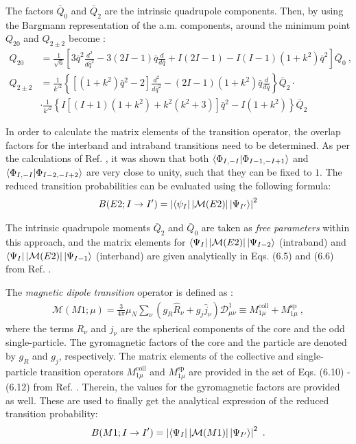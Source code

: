 The factors $\bar{Q}_0$ and $\bar{Q}_2$ are the intrinsic quadrupole components. Then, by using the Bargmann representation of the a.m. components, around the minimum point $Q_{20}$ and $Q_{2\pm2}$ become \cite{raduta2020new}:
\begin{align}
    Q_{20}&=\frac{1}{\sqrt{6}}\left[3\bar{q}^2\frac{d^2}{d\bar{q}^2}-3(2I-1)\bar{q}\frac{d}{d\bar{q}}+I(2I-1)-I(I-1)(1+k^2)\bar{q}^2\right]\bar{Q}_0\ ,\nonumber\\
    Q_{2\pm2}&=\frac{1}{k'^2}\left\{\left[(1+k^2)\bar{q}^2-2\right]\frac{d^2}{d\bar{q}^2}-(2I-1)(1+k^2)\bar{q}\frac{d}{d\bar{q}}\right\}\bar{Q}_2\cdot \nonumber\\
    &\cdot\frac{1}{k'^2}\left\{I\left[(I+1)(1+k^2)+k^2(k^2+3)\right]\bar{q}^2-I(1+k^2)\right\}\bar{Q}_2
\end{align}

In order to calculate the matrix elements of the transition operator, the overlap factors for the interband and intraband transitions need to be determined. As per the calculations of Ref. \cite{raduta2020new}, it was shown that both $\bra{\Phi_{I,-I}}\ket{\Phi_{I-1,-I+1}}$ and $\bra{\Phi_{I,-I}}\ket{\Phi_{I-2,-I+2}}$ are very close to unity, such that they can be fixed to $1$. The reduced transition probabilities can be evaluated using the following formula:
\begin{align}
    B(E2;I\to I')=\left|\bra{\psi_I}|\mathcal{M}(E2)|\ket{\Psi_{I'}}\right|^2
\end{align}

The intrinsic quadrupole moments $\bar{Q}_2$ and $\bar{Q}_0$ are taken as \emph{free parameters} within this approach, and the matrix elements for $\bra{\Psi_I}|\mathcal{M}(E2)|\ket{\Psi_{I-2}}$ (intraband) and $\bra{\Psi_I}|\mathcal{M}(E2)|\ket{\Psi_{I-1}}$ (interband) are given analytically in Eqs. (6.5) and (6.6) from Ref. \cite{raduta2020new}.

The \emph{magnetic dipole transition} operator is defined as \cite{raduta2020new}:
\begin{align}
    \mathcal{M}\left(M1;\mu\right)=\frac{3}{4\pi}\mu_N\sum_{\nu}\left(g_R\hat{R}_\nu+g_j\hat{j}_\nu\right)\mathcal{D}_{\mu\nu}^1\equiv M_{1\mu}^\text{coll}+M_{1\mu}^\text{sp}\ ,
\end{align}
where the terms $R_\nu$ and $j_\nu$ are the spherical components of the core and the odd single-particle. The gyromagnetic factors of the core and the particle are denoted by $g_R$ and $g_j$, respectively. The matrix elements of the collective and single-particle transition operators $M_{1\mu}^\text{coll}$ and $M_{1\mu}^\text{sp}$ are provided in the set of Eqs. (6.10) - (6.12) from Ref. \cite{raduta2020new}. Therein, the values for the gyromagnetic factors are provided as well. These are used to finally get the analytical expression of the reduced transition probability:
\begin{align}
    B(M1;I\to I')=\left|\bra{\Psi_{I}}|\mathcal{M}(M1)|\ket{\Psi_{I'}}\right|^2\ .
\end{align}

